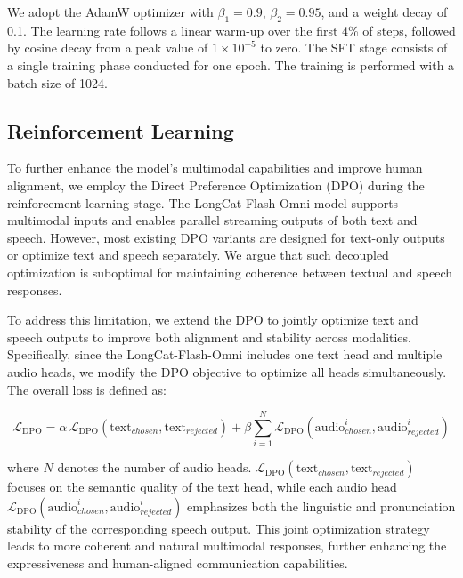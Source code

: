\documentclass{article}
\newcommand{\longcat}{LongCat-Flash-Omni\xspace}
\begin{document}
We adopt the AdamW optimizer with $\beta_1=0.9$, $\beta_2=0.95$, and a weight decay of 0.1. The learning rate follows a linear warm-up over the first 4\% of steps, followed by cosine decay from a peak value of $1\times10^{-5}$ to zero. The SFT stage consists of a single training phase conducted for one epoch. The training is performed with a batch size of 1024.


\subsection{Reinforcement Learning} %
To further enhance the model’s multimodal capabilities and improve human alignment, we employ the Direct Preference Optimization (DPO) \citep{rafailov2023direct} during the reinforcement learning stage. The \longcat model supports multimodal inputs and enables parallel streaming outputs of both text and speech. However, most existing DPO variants are designed for text-only outputs or optimize text and speech separately. We argue that such decoupled optimization is suboptimal for maintaining coherence between textual and speech responses.

To address this limitation, we extend the DPO to jointly optimize text and speech outputs to improve both alignment and stability across modalities. Specifically, since the \longcat includes one text head and multiple audio heads, we modify the DPO objective to optimize all heads simultaneously. The overall loss is defined as:


\[
\mathcal{L}_{\text{DPO}} = 
\alpha \, \mathcal{L}_{\text{DPO}} (\text{text}_{chosen},\text{text}_{rejected}) 
+ \beta \sum_{i=1}^{N} \mathcal{L}_{\text{DPO}}(\text{audio}^{i}_{chosen},\text{audio}^{i}_{rejected})
\]

where $N$ denotes the number of audio heads. $\mathcal{L}_{\text{DPO}} (\text{text}_{chosen},\text{text}_{rejected})$ focuses on the semantic quality of the text head, while each audio head $\mathcal{L}_{\text{DPO}}(\text{audio}^{i}_{chosen},\text{audio}^{i}_{rejected})$ emphasizes both the linguistic and pronunciation stability of the corresponding speech output. This joint optimization strategy leads to more coherent and natural multimodal responses, further enhancing the expressiveness and human-aligned communication capabilities.
\end{document}
